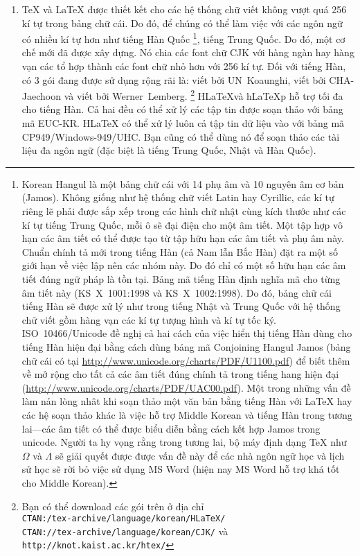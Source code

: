 \begin{enumerate}
\item \TeX{} và \LaTeX{} được thiết kết cho các hệ thống chữ viết
không vượt quá 256 kí tự trong bảng chữ cái. Do đó, để chúng có
thể làm việc với các ngôn ngữ có nhiều kí tự hơn như tiếng Hàn
Quốc%
\footnote{Korean Hangul là một bảng chữ cái với 14 phụ âm và
10 nguyên âm cơ bản (Jamos). Không giống như hệ thống chữ viết
Latin hay Cyrillic, các kí tự riêng lẽ phải được sắp xếp trong các
hình chữ nhật cùng kích thước như các kí tự tiếng Trung Quốc, mỗi
ô sẽ đại điện cho một âm tiết. Một tập hợp vô hạn các âm tiết có
thể được tạo từ tập hữu hạn các âm tiết và phụ âm này. Chuẩn chính
tả mới trong tiếng Hàn (cả Nam lẫn Bắc Hàn) đặt ra một số giới hạn
về việc lập nên các nhóm này. Do đó chỉ có một số hữu hạn các âm
tiết đúng ngữ pháp là tồn tại. Bảng mã tiếng Hàn định nghĩa mã cho
từng âm tiết này (KS~X~1001:1998 và KS~X~1002:1998). Do đó, bảng
chữ cái tiếng Hàn sẽ được xử lý như trong tiếng Nhật và Trung Quốc
với hệ thống chữ viết gồm hàng vạn các kí tự tượng hình và kí tự
tốc ký. ISO~10466/Unicode đề nghị cả hai cách của việc hiển thị
tiếng Hàn dùng cho tiếng Hàn hiện đại bằng cách dùng bảng mã
Conjoining Hangul Jamos (bảng chữ cái có tại
\url{http://www.unicode.org/charts/PDF/U1100.pdf}) để biết thêm về
mở rộng cho tất cả các âm tiết đúng chính tả trong tiếng hang hiện
đại (\url{http://www.unicode.org/charts/PDF/UAC00.pdf}). Một trong
những vấn đề làm nản lòng nhât khi soạn thảo một văn bản bằng
tiếng Hàn với \LaTeX{} hay các hệ soạn thảo khác là việc hỗ trợ
Middle Korean và tiếng Hàn trong tương lai---các âm tiết có thể
được biểu diễn bằng cách kết hợp Jamos trong unicode. Người ta hy
vọng rằng trong tương lai, bộ máy định dạng \TeX{} như $\Omega$ và
$\Lambda$ sẽ giải quyết được được vấn đề này để các nhà ngôn ngữ
học và lịch sử học sẽ rời bỏ việc sử dụng MS Word (hiện nay MS
Word hỗ trợ khá tốt cho Middle Korean).}, tiếng Trung Quốc. Do đó,
một cơ chế mới đã được xây dựng. Nó chia các font chữ CJK với hàng
ngàn hay hàng vạn các tổ hợp thành các font chữ nhỏ hơn với 256 kí
tự. Đối với tiếng Hàn, có 3 gói đang được sử dụng rộng rãi là:
 viết bởi UN~Koaunghi,  viết bởi
CHA-Jaechoon và  viết bởi
Werner~Lemberg.%
\footnote{Bạn có thể download các gói trên ở địa chỉ\\
\texttt{CTAN:/tex-archive/language/korean/HLaTeX/}\\
\texttt{CTAN://tex-archive/language/korean/CJK/} và
\texttt{http://knot.kaist.ac.kr/htex/}} H\LaTeX và h\LaTeX{}p hỗ
trợ tối đa cho tiếng Hàn. Cả hai đều có thể xử lý các tập tin được
soạn thảo với bảng mã EUC-KR. H\LaTeX{} có thể xử lý luôn cả tập
tin dữ liệu vào với bảng mã CP949/Windows-949/UHC. Bạn cũng có thể
dùng nó để soạn thảo các tài liệu đa ngôn ngữ (đặc biệt là tiếng
Trung Quốc, Nhật và Hàn Quốc).


\end{enumerate}

